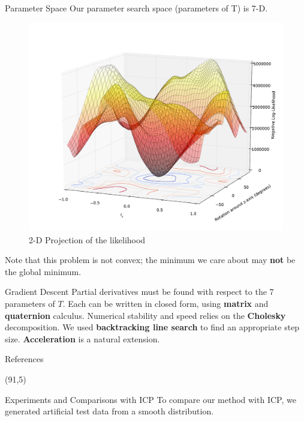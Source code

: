 \documentclass[final]{beamer}
\begin{document}
\begin{frame}{}
\begin{textblock}{27}
\begin{block}{Parameter Space}
Our parameter search space (parameters of T) is 7-D.
\vspace{-.1in}
\begin{figure}
\includegraphics[width=10in]{LLmap3.pdf}
\caption{2-D Projection of the likelihood}
\end{figure}
Note that this problem is not convex; the minimum we care about may {\bf not} be the global minimum. 
\end{block}

\begin{block}{Gradient Descent}
Partial derivatives must be found with respect to the 7 parameters of $T$. Each can be written in closed form,
using {\bf matrix} and {\bf quaternion} calculus. Numerical stability and speed relies on the {\bf Cholesky} decomposition. We used {\bf backtracking line search} to find an appropriate step size. {\bf Acceleration} is a natural extension.
\end{block}


\begin{block}{References}
{
\footnotesize


}
\end{block}


\end{textblock}
\begin{textblock}{27}(91,5)

\begin{block}{Experiments and Comparisons with ICP}
To compare our method with ICP, we generated artificial test data from a smooth distribution.


\end{block}
\end{textblock}
\end{frame}
\end{document}
